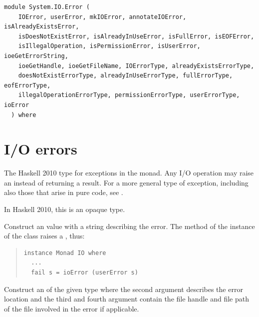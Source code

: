 \label{module:System.IO.Error}
\haddockbeginheader
{\haddockverb\begin{verbatim}
module System.IO.Error (
    IOError, userError, mkIOError, annotateIOError, isAlreadyExistsError,
    isDoesNotExistError, isAlreadyInUseError, isFullError, isEOFError,
    isIllegalOperation, isPermissionError, isUserError, ioeGetErrorString,
    ioeGetHandle, ioeGetFileName, IOErrorType, alreadyExistsErrorType,
    doesNotExistErrorType, alreadyInUseErrorType, fullErrorType, eofErrorType,
    illegalOperationErrorType, permissionErrorType, userErrorType, ioError
  ) where\end{verbatim}}
\haddockendheader

\section{I/O errors}
\begin{haddockdesc}
\item[\begin{tabular}{@{}l}
type IOError = IOException
\end{tabular}]
{\haddockbegindoc
The Haskell 2010 type for exceptions in the  monad.
 Any I/O operation may raise an  instead of returning a result.
 For a more general type of exception, including also those that arise
 in pure code, see .\par
In Haskell 2010, this is an opaque type.\par}
\end{haddockdesc}
\begin{haddockdesc}
\item[\begin{tabular}{@{}l}
userError :: String -> IOError
\end{tabular}]
{\haddockbegindoc
Construct an  value with a string describing the error.
 The  method of the  instance of the  class raises a
 , thus:\par
\begin{quote}
{\haddockverb\begin{verbatim}
instance Monad IO where
  ...
  fail s = ioError (userError s)\end{verbatim}}
\end{quote}}
\end{haddockdesc}
\begin{haddockdesc}
\item[\begin{tabular}{@{}l}
mkIOError :: IOErrorType -> String -> Maybe Handle -> Maybe FilePath -> IOError
\end{tabular}]
{\haddockbegindoc
Construct an  of the given type where the second argument
 describes the error location and the third and fourth argument
 contain the file handle and file path of the file involved in the
 error if applicable.\par}
\end{haddockdesc}
